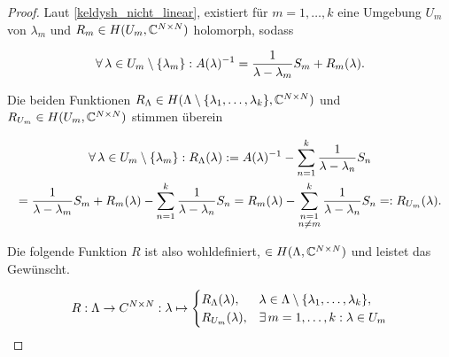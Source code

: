 \begin{proof}

    Laut \ref{keldysh_nicht_linear}, existiert für $m = 1, \dots, k$ eine Umgebung $U_m$ von $\lambda_m$ und $R_m \in H(U_m, \mathbb{C}^{N \times N})$ holomorph, sodass

    \begin{align*}
        \forall \, \lambda \in U_m \setminus {\left \{ \lambda_m \right \}}:
            A(\lambda)^{-1}
            =
            \frac{1}{\lambda - \lambda_m} S_m
            +
            R_m(\lambda).
    \end{align*}

    Die beiden Funktionen $R_\Lambda \in H(\Lambda \setminus {\left \{ \lambda_1, \dots, \lambda_k \right \}}, \mathbb{C}^{N \times N})$ und $R_{U_m} \in H(U_m, \mathbb{C}^{N \times N})$ stimmen überein

    \begin{multline*}
        \forall \, \lambda \in U_m \setminus {\left \{ \lambda_m \right \}}:
            R_\Lambda(\lambda)
            :=
            A(\lambda)^{-1}
            -
            \sum_{n=1}^k
                \frac{1}{\lambda - \lambda_n} S_n \\
            =
            \frac{1}{\lambda - \lambda_m} S_m
            +
            R_m(\lambda)
            -
            \sum_{n=1}^k
                \frac{1}{\lambda - \lambda_n} S_n
            =
            R_m(\lambda)
            -
            \sum_{\substack{n = 1 \\ n \neq m}}^k
                \frac{1}{\lambda - \lambda_n} S_n
            =:
            R_{U_m}(\lambda).
    \end{multline*}

    Die folgende Funktion $R$ ist also wohldefiniert, $\in H(\Lambda, \mathbb{C}^{N \times N})$ und leistet das Gewünscht.

    \begin{align*}
        R:
        \Lambda \to C^{N \times N}:
        \lambda
        \mapsto
        \begin{cases}
            R_\Lambda(\lambda), & \lambda \in \Lambda \setminus {\left \{ \lambda_1, \dots, \lambda_k \right \}}, \\
            R_{U_m}(\lambda),   & \exists \, m = 1, \dots, k: \lambda \in U_m
        \end{cases}
    \end{align*}

\end{proof}
